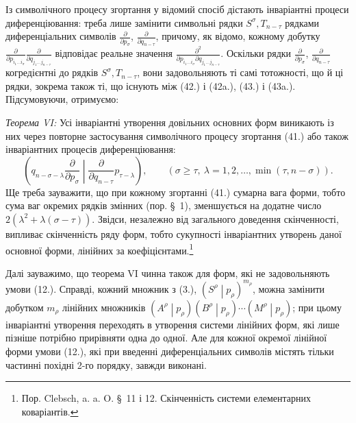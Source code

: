 \documentclass[11pt]{article}
\newcommand{\pair}[2]{\left(#1\middle|#2\right)}
\begin{document}
Із символічного процесу згортання у відомий спосіб дістають інваріантні процеси диференціювання: треба лише замінити символьні рядки $S^\sigma,T_{n-\tau}$ рядками диференціальних символів $\frac{\partial}{\partial p_\sigma}$, $\frac{\partial}{\partial q_{n-\tau}}$, причому, як відомо, кожному добутку $\frac{\partial}{\partial p_{i_1\ldots i_\sigma}}\frac{\partial}{\partial q_{j_1\ldots j_{n-\tau}}}$ відповідає реальне значення $\frac{\partial^2}{\partial p_{i_1\ldots i_\sigma}\partial q_{j_1\ldots j_{n-\tau}}}$. Оскільки рядки $\frac{\partial}{\partial p_\sigma}$, $\frac{\partial}{\partial q_{n-\tau}}$ когредієнтні до рядків $S^\sigma,T_{n-\tau}$, вони задовольняють ті самі тотожності, що й ці рядки, зокрема також ті, що існують між (42.) і (42a.), (43.) і (43a.). Підсумовуючи, отримуємо:

\emph{Теорема VI:} Усі інваріантні утворення довільних основних форм виникають із них через повторне застосування символічного процесу згортання (41.) або також інваріантних процесів диференціювання:
\begin{equation}
 \left(q_{n-\sigma-\lambda}\frac{\partial}{\partial p_\sigma}
 \middle|\frac{\partial}{\partial q_{n-\tau}}p_{\tau-\lambda}\right),
 \qquad(\sigma\ge\tau,\ \lambda=1,2,\ldots,\min(\tau,n-\sigma)).
\tag{45}
\end{equation}
Ще треба зауважити, що при кожному згортанні (41.) сумарна вага форми, тобто сума ваг окремих рядків змінних (пор. \S\ 1), зменшується на додатне число $2(\lambda^2+\lambda(\sigma-\tau))$. Звідси, незалежно від загального доведення скінченності, випливає скінченність ряду форм, тобто сукупності інваріантних утворень даної основної форми, лінійних за коефіцієнтами.\footnote{Пор. Clebsch, a. a. O. \S\ 11 і 12. Скінченність системи елементарних коваріантів.}

Далі зауважимо, що теорема VI чинна також для форм, які не задовольняють умови (12.). Справді, кожний множник з (3.), $\pair{S^\rho}{p_\rho}^{m_\rho}$, можна замінити добутком $m_\rho$ лінійних множників $\pair{A^\rho}{p_\rho}\pair{B^\rho}{p_\rho}\cdots\pair{M^\rho}{p_\rho}$; при цьому інваріантні утворення переходять в утворення системи лінійних форм, які лише пізніше потрібно прирівняти одна до одної. Але для кожної окремої лінійної форми умови (12.), які при введенні диференціальних символів містять тільки частинні похідні 2-го порядку, завжди виконані.
\end{document}
